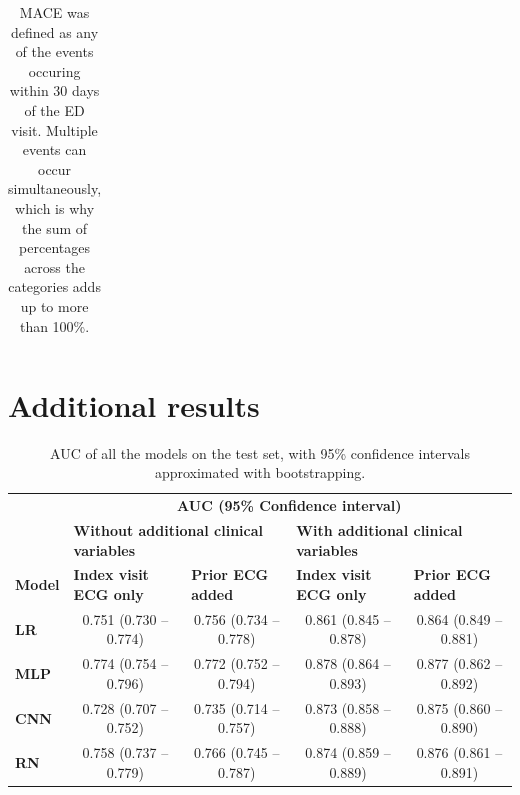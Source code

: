 \documentclass[preprint]{elsarticle}
\begin{document}
\begin{table}[H]
\begin{adjustbox}{center}
\begin{tabular}{@{}p{3.1cm}lrr@{}}
\bottomrule
\end{tabular}
\end{adjustbox}
\caption{MACE was defined as any of the events occuring within 30 days of the ED visit. Multiple events can occur simultaneously, which is why the sum of percentages across the categories adds up to more than 100\%.}
\label{table:appendix:mace}
\end{table}
\renewcommand{\arraystretch}{1}


\section{Additional results}
\label{sec:appendix:results}

\renewcommand{\arraystretch}{1.2}
\begin{table}[H]
  \centering
  \scriptsize
\begin{adjustbox}{center}
\begin{tabular}{@{}lcccc@{}}
  \toprule
  & \multicolumn{4}{c}{\textbf{AUC (95\% Confidence interval)}} \\
  \cmidrule(lr){2-5}
  & \multicolumn{2}{l}{\textbf{Without additional clinical variables}} & \multicolumn{2}{l}{\textbf{With additional clinical variables}} \\
  \cmidrule(lr){2-3}\cmidrule(lr){4-5}
\textbf{Model} & \multicolumn{1}{l}{\textbf{Index visit ECG only}} & \multicolumn{1}{l}{\textbf{Prior ECG added}} & \multicolumn{1}{l}{\textbf{Index visit ECG only}} & \multicolumn{1}{l}{\textbf{Prior ECG added}} \\
  \midrule

\textbf{LR} & 0.751 (0.730 -- 0.774) & 0.756 (0.734 -- 0.778) & 0.861 (0.845 -- 0.878) & 0.864 (0.849 -- 0.881) \\
\textbf{MLP} & 0.774 (0.754 -- 0.796) & 0.772 (0.752 -- 0.794) & 0.878 (0.864 -- 0.893) & 0.877 (0.862 -- 0.892) \\
\textbf{CNN} & 0.728 (0.707 -- 0.752) & 0.735 (0.714 -- 0.757) & 0.873 (0.858 -- 0.888) & 0.875 (0.860 -- 0.890) \\
\textbf{RN} & 0.758 (0.737 -- 0.779) & 0.766 (0.745 -- 0.787) & 0.874 (0.859 -- 0.889) & 0.876 (0.861 -- 0.891) \\

\bottomrule
\end{tabular}
\end{adjustbox}
\caption{AUC of all the models on the test set, with 95\% confidence intervals approximated with bootstrapping.}
\label{table:appendix:mainresults}
\end{table}
\renewcommand{\arraystretch}{1}
\end{document}
